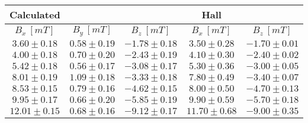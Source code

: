 \documentclass{report}
\begin{document}
\begin{center}
  \begin{tabular}{|c|c|c||c|c|} \hline
    Calculated & & & Hall &\\ \hline
    $B_x \ [mT]$ & $B_y \ [mT]$ & $B_z \ [mT]$ & $B_x \ [mT]$ & $B_z \ [mT]$ \\ \hline
    $ 3.60 \pm 0.18 $ & $ 0.58 \pm 0.19 $ & $ -1.78 \pm 0.18 $ & $ 3.50 \pm 0.28 $ & $ -1.70 \pm 0.01 $ \\ \hline
    $ 4.00 \pm 0.18 $ & $ 0.70 \pm 0.20 $ & $ -2.43 \pm 0.19 $ & $ 4.10 \pm 0.30 $ & $ -2.40 \pm 0.02 $ \\ \hline
    $ 5.42 \pm 0.18 $ & $ 0.56 \pm 0.17 $ & $ -3.08 \pm 0.17 $ & $ 5.30 \pm 0.36 $ & $ -3.00 \pm 0.05 $ \\ \hline
    $ 8.01 \pm 0.19 $ & $ 1.09 \pm 0.18 $ & $ -3.33 \pm 0.18 $ & $ 7.80 \pm 0.49 $ & $ -3.40 \pm 0.07 $ \\ \hline
    $ 8.53 \pm 0.15 $ & $ 0.79 \pm 0.16 $ & $ -4.62 \pm 0.15 $ & $ 8.00 \pm 0.50 $ & $ -4.70 \pm 0.13 $ \\ \hline
    $ 9.95 \pm 0.17 $ & $ 0.66 \pm 0.20 $ & $ -5.85 \pm 0.19 $ & $ 9.90 \pm 0.59 $ & $ -5.70 \pm 0.18 $ \\ \hline
    $ 12.01 \pm 0.15 $ & $ 0.68 \pm 0.16 $ & $ -9.12 \pm 0.17 $ & $ 11.70 \pm 0.68 $ & $ -9.00 \pm 0.35 $ \\ \hline
  \end{tabular}
\end{center}
\end{document}
